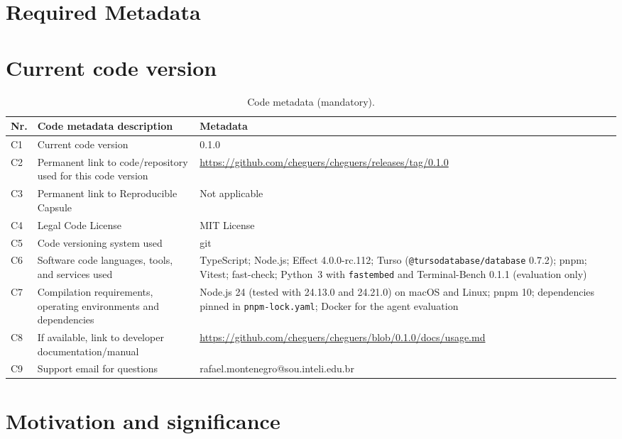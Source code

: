 \documentclass[preprint,12pt,a4paper]{elsarticle}
\newcommand{\code}[1]{\texttt{#1}}
\begin{document}
\section*{Required Metadata}
\label{sec:metadata}

\section*{Current code version}

\begin{table}[H]
\small
\begin{tabular}{|l|p{5.1cm}|p{6.5cm}|}
\hline
\textbf{Nr.} & \textbf{Code metadata description} & \textbf{Metadata} \\
\hline
C1 & Current code version & 0.1.0 \\
\hline
C2 & Permanent link to code/repository used for this code version & \url{https://github.com/cheguers/cheguers/releases/tag/0.1.0} \\
\hline
C3 & Permanent link to Reproducible Capsule & Not applicable \\
\hline
C4 & Legal Code License & MIT License \\
\hline
C5 & Code versioning system used & git \\
\hline
C6 & Software code languages, tools, and services used & TypeScript; Node.js; Effect 4.0.0-rc.112; Turso (\code{@tursodatabase/database} 0.7.2); pnpm; Vitest; fast-check; Python~3 with \code{fastembed} and Terminal-Bench 0.1.1 (evaluation only) \\
\hline
C7 & Compilation requirements, operating environments and dependencies & Node.js 24 (tested with 24.13.0 and 24.21.0) on macOS and Linux; pnpm 10; dependencies pinned in \code{pnpm-lock.yaml}; Docker for the agent evaluation \\
\hline
C8 & If available, link to developer documentation/manual & \url{https://github.com/cheguers/cheguers/blob/0.1.0/docs/usage.md} \\
\hline
C9 & Support email for questions & rafael.montenegro@sou.inteli.edu.br \\
\hline
\end{tabular}
\caption{Code metadata (mandatory).}
\label{tab:metadata}
\end{table}

\section{Motivation and significance}
\label{sec:motivation}
\end{document}
